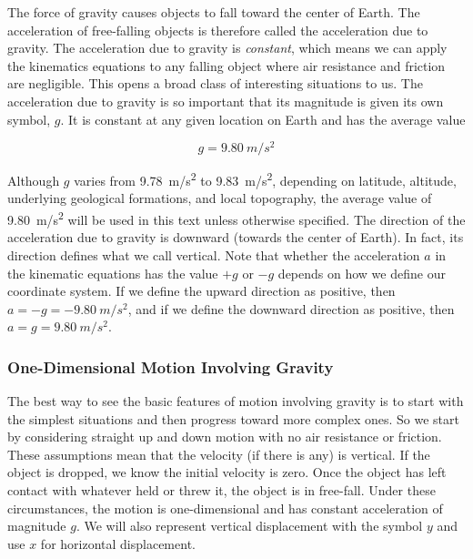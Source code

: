 \documentclass[../../main-ap-physics.tex]{subfiles}
\begin{document}
\vspace{1em}

The force of gravity causes objects to fall toward the center of Earth. The acceleration of free-falling objects is therefore called the \gls{acceleration due to gravity}. The acceleration due to gravity is \textit{constant}, which means we can apply the kinematics equations to any falling object where air resistance and friction are negligible. This opens a broad class of interesting situations to us. The acceleration due to gravity is so important that its magnitude is given its own symbol, $g$. It is constant at any given location on Earth and has the average value

\begin{equation}
    g = \SI{9.80}{m/s^2}
\end{equation}

Although $g$ varies from \SI{9.78}{m/s^2} to \SI{9.83}{m/s^2}, depending on latitude, altitude, underlying geological formations, and local topography, the average value of \SI{9.80}{m/s^2} will be used in this text unless otherwise specified. The direction of the acceleration due to gravity is downward (towards the center of Earth). In fact, its direction defines what we call vertical. Note that whether the acceleration $a$ in the kinematic equations has the value $+g$ or $-g$ depends on how we define our coordinate system. If we define the upward direction as positive, then $a = -g = -\SI{9.80}{m/s^2}$, and if we define the downward direction as positive, then $a = g = \SI{9.80}{m/s^2}$.

\subsubsection*{One-Dimensional Motion Involving Gravity}

The best way to see the basic features of motion involving gravity is to start with the simplest situations and then progress toward more complex ones. So we start by considering straight up and down motion with no air resistance or friction. These assumptions mean that the velocity (if there is any) is vertical. If the object is dropped, we know the initial velocity is zero. Once the object has left contact with whatever held or threw it, the object is in free-fall. Under these circumstances, the motion is one-dimensional and has constant acceleration of magnitude $g$. We will also represent vertical displacement with the symbol $y$ and use $x$ for horizontal displacement.
\end{document}
